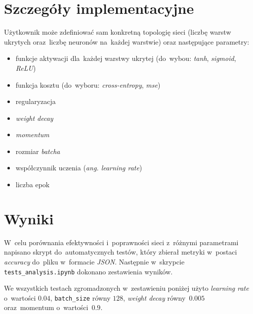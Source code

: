 \documentclass[11pt, a4paper]{article}
\begin{document}
\section {Szczegóły implementacyjne}
Użytkownik może zdefiniować sam konkretną topologię sieci (liczbę warstw ukrytych oraz~liczbę neuronów na~każdej warstwie) oraz następujące parametry:
\begin{itemize}
    \item funkcje aktywacji dla~każdej warstwy ukrytej (do~wybou: \textit{tanh}, \textit{sigmoid}, \textit{ReLU})
    \item funkcja kosztu (do~wyboru: \textit{cross-entropy}, \textit{mse})
    \item regularyzacja
    \item \textit{weight decay}
    \item \textit{momentum}
    \item rozmiar \textit{batcha}
    \item współczynnik uczenia (\textit{ang. learning rate})
    \item liczba epok
\end{itemize}
\section {Wyniki}
W~celu porównania efektywności i~poprawności sieci z~różnymi parametrami napisano skrypt do~automatycznych testów, który zbierał metryki w~postaci \textit{accuracy} do~pliku w~formacie \textit{JSON}.
Następnie w~skrypcie \texttt{tests\_analysis.ipynb} dokonano zestawienia wyników.
 
We wszystkich testach zgromadzonych w~zestawieniu poniżej użyto \textit{learning rate} o~wartości $0.04$, \texttt{batch\_size} równy $128$,
\textit{weight decay} równy~$0.005$ oraz~momentum o~wartości~$0.9$.
\end{document}
